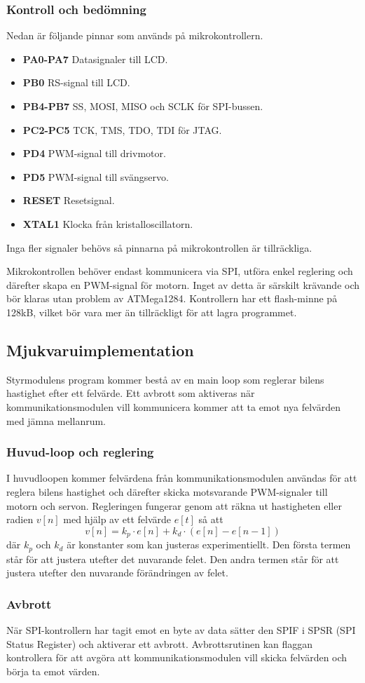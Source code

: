 \documentclass[designspec/spec.tex]{subfiles}
\begin{document}
\subsubsection{Kontroll och bedömning}
Nedan är följande pinnar som används på mikrokontrollern.
\begin{itemize}
   \item \textbf{PA0-PA7} Datasignaler till LCD.
   \item \textbf{PB0} RS-signal till LCD.
   \item \textbf{PB4-PB7} SS, MOSI, MISO och SCLK för SPI-bussen.
   \item \textbf{PC2-PC5} TCK, TMS, TDO, TDI för JTAG.
   \item \textbf{PD4} PWM-signal till drivmotor.
   \item \textbf{PD5} PWM-signal till svängservo.
   \item \textbf{RESET} Resetsignal.
   \item \textbf{XTAL1} Klocka från kristalloscillatorn.
\end{itemize}
Inga fler signaler behövs så pinnarna på mikrokontrollen är tillräckliga.

Mikrokontrollen behöver endast kommunicera via SPI, utföra enkel reglering och
därefter skapa en PWM-signal för motorn. Inget av detta är särskilt krävande
och bör klaras utan problem av ATMega1284. Kontrollern har ett flash-minne på
128kB, vilket bör vara mer än tillräckligt för att lagra programmet.

\subsection{Mjukvaruimplementation}
Styrmodulens program kommer bestå av en main loop som reglerar bilens hastighet
efter ett felvärde. Ett avbrott som aktiveras när kommunikationsmodulen vill
kommunicera kommer att ta emot nya felvärden med jämna mellanrum.

\subsubsection{Huvud-loop och reglering}
I huvudloopen kommer felvärdena från kommunikationsmodulen användas för att
reglera bilens hastighet och därefter skicka motsvarande PWM-signaler till
motorn och servon. Regleringen fungerar genom att räkna ut hastigheten eller
radien $v[n]$ med hjälp av ett felvärde $e[t]$ så att
\begin{equation*}
    v[n] = k_p \cdot e[n] + k_d \cdot (e[n]-e[n-1])
\end{equation*}
där $k_p$ och $k_d$ är konstanter som kan justeras experimentiellt. Den första
termen står för att justera utefter det nuvarande felet. Den andra termen står
för att justera utefter den nuvarande förändringen av felet.

\subsubsection{Avbrott} \label{sec:ctrl-int}
När SPI-kontrollern har tagit emot en byte av data sätter den SPIF i SPSR (SPI
Status Register) och aktiverar ett avbrott. Avbrottsrutinen kan flaggan
kontrollera för att avgöra att kommunikationsmodulen vill skicka felvärden och
börja ta emot värden.
\end{document}
